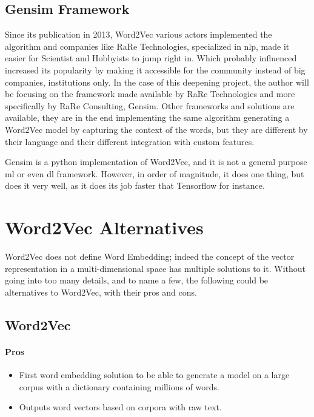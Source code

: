 \subsection{Gensim Framework}
Since its publication in 2013, Word2Vec\cite{article:word2vec} various actors implemented the algorithm and companies like RaRe Technologies\cite{company:rare-technologies}, specialized in \gls{nlp}, made it easier for Scientist and Hobbyists to jump right in. Which probably influenced increased its popularity by making it accessible for the community instead of big companies, institutions only. In the case of this deepening project, the author will be focusing on the framework made available by RaRe Technologies and more specifically by RaRe Consulting\cite{company:rare-consulting}, Gensim\cite{article:rehurek_lrec}. Other frameworks and solutions are available, they are in the end implementing the same algorithm generating a Word2Vec model by capturing the context of the words, but they are different by their language and their different integration with custom features.

Gensim is a python implementation of Word2Vec, and it is not a general purpose \gls{ml} or even \gls{dl} framework. However, in order of magnitude, it does one thing, but does it very well, as it does its job faster that Tensorflow\cite{article:tensorflow2015-whitepaper} for instance.

\section{Word2Vec Alternatives}
Word2Vec does not define Word Embedding; indeed the concept of the vector representation in a multi-dimensional space has multiple solutions to it. Without going into too many details, and to name a few, the following could be alternatives to Word2Vec, with their pros and cons.

\subsection{Word2Vec\cite{article:word2vec}}
\paragraph{Pros}
\begin{itemize}
    \setlength\itemsep{0em}
    \item First word embedding solution to be able to generate a model on a large corpus with a dictionary containing millions of words.
    \item Outputs word vectors based on corpora with raw text.
\end{itemize}

